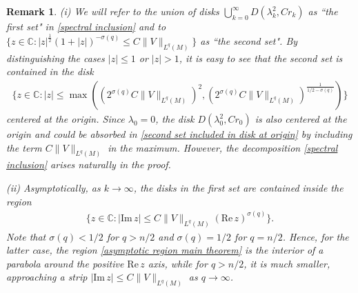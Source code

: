 \documentclass[12pt]{amsart}
\newcommand{\C}{{\mathbb C}}
\newcommand\re{\mathrm{Re}\,}
\newcommand\im{\mathrm{Im}\,}
\newtheorem{remark}[theorem]{Remark}
\begin{document}
\begin{remark}
\noindent (i) We will refer to the union of disks $\bigcup_{k=0}^{\infty}D(\lambda_k^2,Cr_k)$ as ``the first set" in \eqref{spectral inclusion} and to $\{z\in\C: |z|^{\frac{1}{2}}(1+|z|)^{-\sigma(q)}\leq C \|V\|_{L^q(M)}\}$ as ``the second set". By distinguishing the cases $|z|\leq 1$ or $|z|>1$, it is easy to see that the second set is contained in the disk
\begin{align}\label{second set included in disk at origin}
 \{z\in\C: |z|\leq \max((2^{\sigma(q)}C \|V\|_{L^q(M)})^2,(2^{\sigma(q)}C \|V\|_{L^q(M)})^{\frac{1}{1/2-\sigma(q)}})\} 
\end{align}
centered at the origin. Since $\lambda_0=0$, the disk $D(\lambda_0^2,Cr_0)$ is also centered at the origin and could be absorbed in \eqref{second set included in disk at origin} by including the term $C\|V\|_{L^q(M)}$ in the maximum. However, the decomposition \eqref{spectral inclusion} arises naturally in the proof.


\noindent (ii) Asymptotically, as $k\to\infty$, the disks in the first set are contained inside the region
\begin{align}\label{asymptotic region main theorem}
    \{z\in\C: |\im z|\leq C\|V\|_{L^q(M)} (\re z)^{\sigma(q)}\}.
\end{align}
Note that $\sigma(q)<1/2$ for $q>n/2$ and $\sigma(q)=1/2$ for $q=n/2$. Hence, for the latter case, the region \eqref{asymptotic region main theorem} is the interior of a parabola around the positive $\re z$ axis, while for $q>n/2$, it is much smaller, approaching a strip $|\im z|\leq C\|V\|_{L^q(M)}$ as $q\to\infty$. 
\end{remark}
\end{document}
